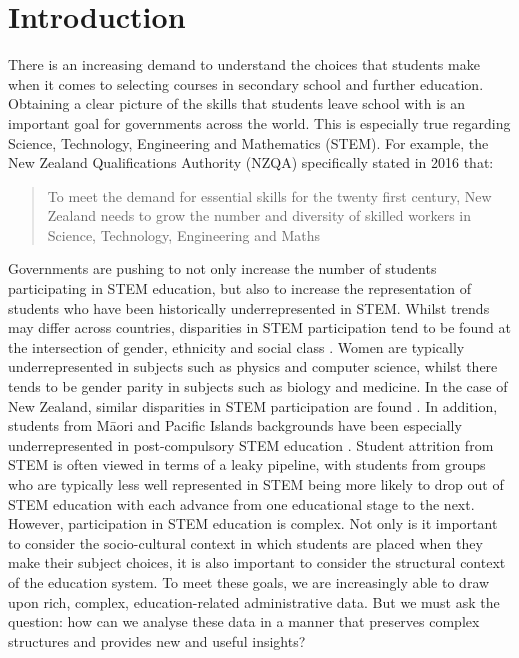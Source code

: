 \section{Introduction}
There is an increasing demand to understand the choices that students make when it comes to selecting courses in secondary school and further education. Obtaining a clear picture of the skills that students leave school with is an important goal for governments across the world. This is especially true regarding Science, Technology, Engineering and Mathematics (STEM). For example, the New Zealand Qualifications Authority (NZQA) \citep[p.8]{NZQA2016} specifically stated in 2016 that:

\begin{quote}
    To meet the demand for essential skills for the twenty first century, New Zealand needs to grow the number and diversity of skilled workers in Science, Technology, Engineering and Maths
\end{quote}  

Governments are pushing to not only increase the number of students participating in STEM education, but also to increase the representation of students who have been historically underrepresented in STEM. Whilst trends may differ across countries, disparities in STEM participation tend to be found at the intersection of gender, ethnicity and social class \citep{Archer2015b, PISA_NZ_2017}. Women are typically underrepresented in subjects such as physics and computer science, whilst there tends to be gender parity in subjects such as biology and medicine. In the case of New Zealand, similar disparities in STEM participation are found \citep{NZQA2016,EducationCounts_2016a,EducationCounts_2016b}. In addition, students from M\={a}ori and Pacific Islands backgrounds have been especially underrepresented in post-compulsory STEM education \citep{MoH2014, NZQA2016}. Student attrition from STEM is often viewed in terms of a leaky pipeline, with students from groups who are typically less well represented in STEM being more likely to drop out of STEM education with each advance from one educational stage to the next. However, participation in STEM education is  complex. Not only is it important to consider the socio-cultural context in which students are placed when they make their subject choices, it is also important to consider the structural context of the education system. To meet these goals, we are increasingly able to draw upon rich, complex, education-related administrative data. But we must ask the question: how can we analyse these data in a manner that preserves complex structures and provides new and useful insights?


